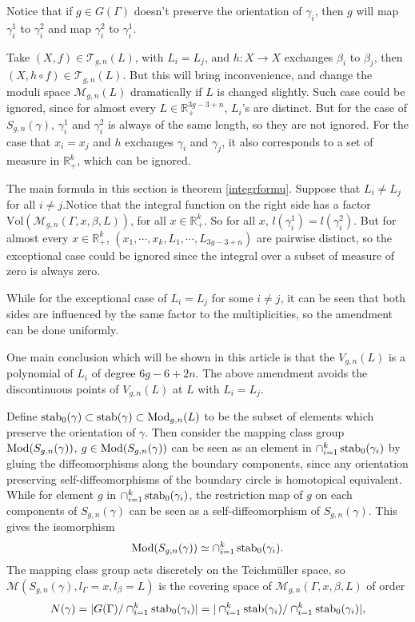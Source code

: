  \begin{remark}
 Notice that if $g\in G(\Gamma)$ doesn't preserve the orientation of $\gamma_i$, then $g$ will map $\gamma_i^1$ to $\gamma_i^2$ and map $\gamma_i^2$ to $\gamma_i^1$.
 
 Take $(X,f)\in \mathscr{T}_{g,n}(L)$, with $L_i=L_j$, and $h:X\to X$ exchanges $\beta_i$ to $\beta_j$, then $(X,h\circ f)\in \mathscr{T}_{g,n}(L)$. But this will bring inconvenience, and change the moduli space $\mathscr{M}_{g,n}(L)$  dramatically if $L$ is changed slightly. Such case could be ignored, since for almost every $L\in \mathbb{R}_+^{3g-3+n}$, $L_i$'s are  distinct. But for the case of $S_{g,n}(\gamma)$, $\gamma_i^1$ and $\gamma_i^2$ is always of the same length, so they are not ignored.  For the case that $x_i=x_j$ and $h$ exchanges $\gamma_i$  and $\gamma_j$, it also corresponds to a set of measure in $\mathbb{R}_+^k$, which can be ignored.
 
 The main formula in this section is theorem \ref{integrformu}. Suppose that $L_i\neq L_j$ for all $i\neq j$.Notice that the integral function on the right side has a factor  $\mathrm{Vol}(\mathscr{M}_{g,n}(\Gamma,x,\beta,L))$, for all $x\in \mathbb{R}_{+}^k$. So for all $x$, $l(\gamma_i^1)=l(\gamma_i^2)$. 
  But for almost every $x\in \mathbb{R}_{+}^k$, $(x_1,\cdots,x_k,L_1,\cdots,L_{3g-3+n})$ are pairwise distinct, so the exceptional case could be ignored since the integral over a subset of measure of zero is always zero.
 
 While for the exceptional case of $L_i=L_j$ for some $i\neq j$, it can be seen that both sides are influenced by the same factor to the  multiplicities, so the amendment can be done uniformly. 
 
 One main conclusion which  will be shown in  this article is that the $V_{g,n}(L)$ is a polynomial of $L_i$ of degree $6g-6+2n$. The above amendment avoids the  discontinuous points of $V_{g,n}(L)$ at $L$ with $L_i=L_j$.
\end{remark}

 
 
 
 Define $\operatorname{stab}_0(\gamma)\subset \operatorname{stab}(\gamma)\subset \operatorname{Mod}_{g,n}(L)$ to be the subset of  elements which preserve the orientation of $\gamma$. Then consider the mapping class group $\operatorname{Mod}(S_{g,n}(\gamma))$, $g\in \operatorname{Mod}(S_{g,n}(\gamma))$ can be seen as an element in $\cap_{i=1}^k \operatorname{stab}_0(\gamma_i)$ by gluing the diffeomorphisms along the boundary components, since any orientation preserving self-diffeomorphisms of the boundary circle is homotopical equivalent. While for element $g$ in  $\cap_{i=1}^k\operatorname{stab}_0(\gamma_i)$,  the restriction map of $g$ on each components of $S_{g,n}(\gamma)$ can be seen as a self-diffeomorphism of $S_{g,n}(\gamma)$. This gives the isomorphism $$
 \operatorname{Mod} (S_{g,n}(\gamma))\simeq \cap_{i=1}^k\operatorname{stab}_0(\gamma_i).
 $$
 The mapping class group acts discretely on the Teichm\"uller space, so $\mathscr{M}(S_{g,n}(\gamma),l_\Gamma=x,l_\beta=L)$ is  the covering space of $\mathscr{M}_{g,n}(\Gamma,x,\beta,L)$ of order $$
 N(\gamma)=|G(\Gamma)/\cap_{i=1}^k\operatorname{stab}_0(\gamma_i)|=|\cap_{i=1}^k\operatorname{stab}(\gamma_i)/\cap_{i=1}^k\operatorname{stab}_0(\gamma_i)|,
 $$
 

